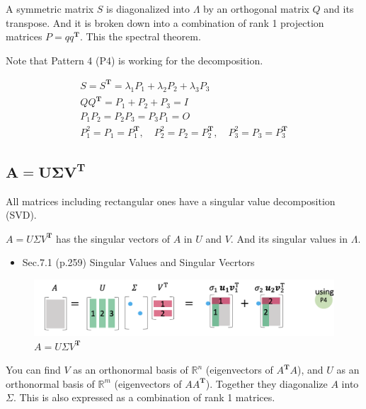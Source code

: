 \documentclass[letterpaper]{article}
\begin{document}
A symmetric matrix $S$ is diagonalized into $\Lambda$  by an orthogonal matrix $Q$
and its transpose. And it is broken down into a combination of rank 1 projection matrices $P=qq^\mathbf{T}$.
This the spectral theorem.

Note that Pattern 4 (P4) is working for the decomposition.

\begin{gather*}
  S=S^\mathbf{T} = \lambda_1 P_1 + \lambda_2 P_2 + \lambda_3 P_3\\
  QQ^\mathbf{T} = P_1 + P_2 + P_3 = I \\
  P_1 P_2 = P_2 P_3 = P_3 P_1 = O\\
  P_1^2 =P_1=P_1^\mathbf{T}, \quad P_2^2=P_2=P_2^\mathbf{T}, \quad P_3^2=P_3=P_3^\mathbf{T}
\end{gather*}

\clearpage

\subsection{$\boldsymbol{A=U \Sigma V^\mathbf{T}}$}

All matrices including rectangular ones have a singular value decomposition (SVD).

$A=U \Sigma V^\mathbf{T}$ has the singular vectors of $A$ in $U$ and $V$.
And its singular values in $\Lambda$.

\begin{itemize}
  \item Sec.7.1 (p.259) Singular Values and Singular Vecrtors
\end{itemize}


\begin{figure}[H]
  \includegraphics[keepaspectratio, width=\linewidth]{SVD.png}
  \caption{$A=U \Sigma V^\mathbf{T}$}
\end{figure}

You can find $V$ as an orthonormal basis of $\mathbb{R}^n$ (eigenvectors of $A^\mathbf{T}A$),
and $U$ as an orthonormal basis of $\mathbb{R}^m$ (eigenvectors of $AA^\mathbf{T}$).
Together they diagonalize $A$ into $\Sigma$.
This is also expressed as a combination of rank 1 matrices.
\end{document}
